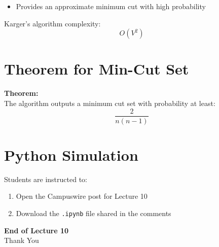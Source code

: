 \documentclass[12pt]{article}
\begin{document}
\begin{itemize}
    \item Provides an approximate minimum cut with high probability
\end{itemize}

Karger’s algorithm complexity:
\[
O(V^2)
\]

\section{Theorem for Min-Cut Set}

\textbf{Theorem:} \\
The algorithm outputs a minimum cut set with probability at least:
\[
\frac{2}{n(n-1)}
\]

\section{Python Simulation}

Students are instructed to:
\begin{enumerate}
    \item Open the Campuswire post for Lecture 10
    \item Download the \texttt{.ipynb} file shared in the comments
\end{enumerate}

\vspace{0.5cm}

\begin{center}
\textbf{End of Lecture 10} \\
Thank You
\end{center}
\end{document}
